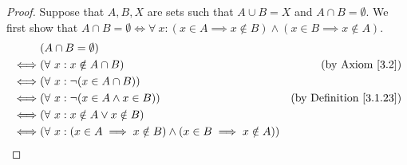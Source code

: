 \begin{proof}
    Suppose that \(A, B, X\) are sets such that \(A \cup B = X\) and \(A \cap B = \emptyset\).
    We first show that \(A \cap B = \emptyset \iff \forall\ x : (x \in A \implies x \notin B) \land (x \in B \implies x \notin A)\).
    \begin{align*}
             & (A \cap B = \emptyset)                                                                                                 \\
        \iff & (\forall\ x : x \notin A \cap B)                                                 & \text{(by Axiom \ref{3.2})}         \\
        \iff & (\forall\ x : \lnot (x \in A \cap B))                                                                                  \\
        \iff & (\forall\ x : \lnot (x \in A \land x \in B))                                     & \text{(by Definition \ref{3.1.23})} \\
        \iff & (\forall\ x : x \notin A \lor x \notin B)                                                                              \\
        \iff & (\forall\ x : (x \in A \implies x \notin B) \land (x \in B \implies x \notin A))                                       \\
    \end{align*}


\end{proof}
